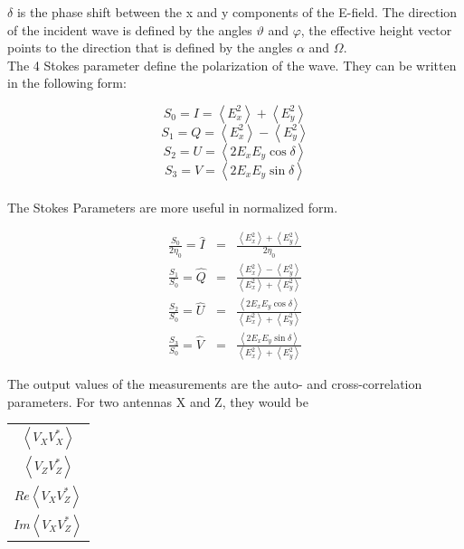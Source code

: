 \documentclass[a4paper,14pt]{extbook}
\begin{document}
$\delta$ is the phase shift between the x and y components of the E-field. The direction of the incident wave is defined by the angles $\vartheta$ and $\varphi$, the effective height vector points to the direction that is defined by the angles $\alpha$ and $\Omega$.\\

The 4 Stokes parameter define the polarization of the wave. They can be written in the following form:

\begin{equation}
S_0=I= \left\langle E_{x}^2\right\rangle +\left\langle E_{y}^2\right\rangle
\end{equation}
\begin{equation}
S_1=Q=\left\langle E_{x}^2\right\rangle-\left\langle E_{y}^2\right\rangle
\end{equation}
\begin{equation}
S_2=U=\left\langle2E_{x} E_{y} \cos \delta \right\rangle
\end{equation}
\begin{equation}
S_3=V=\left\langle2E_{x} E_{y} \sin\delta\right\rangle
\end{equation}
\\
The Stokes Parameters are more useful in normalized form.

\begin{eqnarray}
\frac{S_0}{2\eta_0} = \hat{I} &=& \frac{\left\langle E_{x}^2\right\rangle +\left\langle E_{y}^2\right\rangle}{2\eta_0} \label{norm_stokes_1}
\\
\frac{S_1}{S_0}=\hat{Q}&=&\frac{\left\langle E_{x}^2\right\rangle-\left\langle E_{y}^2\right\rangle}{\left\langle E_{x}^2\right\rangle +\left\langle E_{y}^2\right\rangle}\label{norm_stokes_2}
\\
\frac{S_2}{S_0}=\hat{U}&=&\frac{\left\langle2E_{x} E_{y} \cos\delta\right\rangle}{\left\langle E_{x}^2\right\rangle +\left\langle E_{y}^2\right\rangle}\label{norm_stokes_3}
\\
\frac{S_3}{S_0}=\hat{V}&=&\frac{\left\langle2E_{x} E_{y} \sin\delta\right\rangle}{\left\langle E_{x}^2\right\rangle +\left\langle E_{y}^2\right\rangle}\label{norm_stokes_4}
\end{eqnarray}

The output values of the measurements are the auto- and cross-correlation parameters. For two antennas X and Z, they would be

\begin{center}
\begin{tabular}{c}
$\left\langle V_X V_X^* \right\rangle $  \\
$\left\langle V_Z V_Z^* \right\rangle $  \\
$Re\left\langle V_X V_Z^* \right\rangle $  \\
$Im\left\langle V_X V_Z^* \right\rangle $  \\
\end{tabular}
\end{center}
\end{document}
